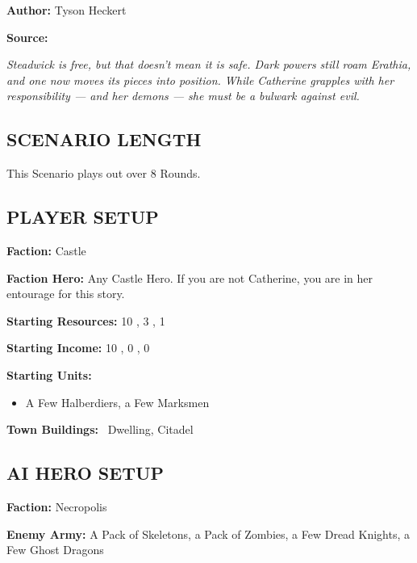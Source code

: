 \cleardoublepage{}

\begin{multicols*}{2}

\textbf{Author:} Tyson Heckert

\textbf{Source:} 

\textit{Steadwick is free, but that doesn't mean it is safe.
Dark powers still roam Erathia, and one now moves its pieces into position.
While Catherine grapples with her responsibility — and her demons — she must be a bulwark against evil.}

\subsection*{\MakeUppercase{Scenario length}}

This Scenario plays out over 8 Rounds.

\subsection*{\MakeUppercase{Player setup}}

\textbf{Faction:} Castle

\textbf{Faction Hero:} Any Castle Hero. If you are not Catherine, you are in her entourage for this story.

\textbf{Starting Resources:} 10 , 3 , 1 

\textbf{Starting Income:} 10 , 0 , 0 

\textbf{Starting Units:}
\begin{itemize}
  \item A Few Halberdiers, a Few Marksmen
\end{itemize}

\textbf{Town Buildings:} \bronze\ Dwelling, Citadel

\subsection*{\MakeUppercase{AI Hero setup}}

\textbf{Faction:} Necropolis

\textbf{Enemy Army:} A Pack of Skeletons, a Pack of Zombies, a Few Dread Knights, a Few Ghost Dragons


\end{multicols*}
